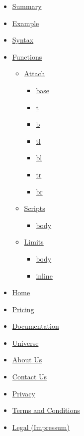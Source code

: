 \begin{itemize}
\tightlist
\item
  \hyperref[summary]{Summary}
\item
  \hyperref[example]{Example}
\item
  \hyperref[syntax]{Syntax}
\item
  \hyperref[functions]{Functions}

  \begin{itemize}
  \tightlist
  \item
    \hyperref[functions-attach]{Attach}

    \begin{itemize}
    \tightlist
    \item
      \hyperref[functions-attach-base]{base}
    \item
      \hyperref[functions-attach-t]{t}
    \item
      \hyperref[functions-attach-b]{b}
    \item
      \hyperref[functions-attach-tl]{tl}
    \item
      \hyperref[functions-attach-bl]{bl}
    \item
      \hyperref[functions-attach-tr]{tr}
    \item
      \hyperref[functions-attach-br]{br}
    \end{itemize}
  \item
    \hyperref[functions-scripts]{Scripts}

    \begin{itemize}
    \tightlist
    \item
      \hyperref[functions-scripts-body]{body}
    \end{itemize}
  \item
    \hyperref[functions-limits]{Limits}

    \begin{itemize}
    \tightlist
    \item
      \hyperref[functions-limits-body]{body}
    \item
      \hyperref[functions-limits-inline]{inline}
    \end{itemize}
  \end{itemize}
\end{itemize}

\begin{itemize}
\tightlist
\item
  \href{/}{Home}
\item
  \href{/pricing/}{Pricing}
\item
  \href{/docs/}{Documentation}
\item
  \href{/universe/}{Universe}
\item
  \href{/about/}{About Us}
\item
  \href{/contact/}{Contact Us}
\item
  \href{/privacy/}{Privacy}
\item
  \href{https://typst.app/terms}{Terms and Conditions}
\item
  \href{/legal/}{Legal (Impressum)}
\end{itemize}

